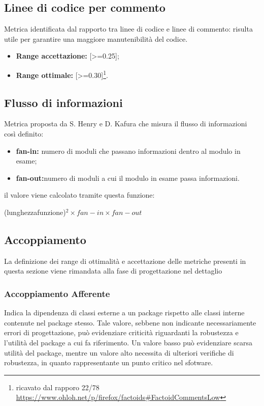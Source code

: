 \subsection{Linee di codice per commento}
Metrica identificata dal rapporto tra linee di codice e linee di commento: risulta utile per garantire una maggiore manutenibilità del codice.

\begin{itemize}
	\item \textbf{Range accettazione:} [>=0.25];
	\item \textbf{Range ottimale:} [>=0.30]\footnote{ricavato dal rapporo 22/78 \url{https://www.ohloh.net/p/firefox/factoids\#FactoidCommentsLow}}.
\end{itemize}  

\subsection{Flusso di informazioni}
Metrica proposta da S. Henry e D. Kafura che misura il flusso di informazioni così definito:

\begin{itemize}
	\item \textbf{fan-in:} numero di moduli che passano informazioni dentro al modulo in esame;
	\item \textbf{fan-out:}numero di moduli a cui il modulo in esame passa informazioni.
\end{itemize} 
il valore viene calcolato tramite questa funzione:
\begin{center}
(lunghezzafunzione)$^2\times fan-in\times fan-out$
\end{center}


\subsection{Accoppiamento}
La definizione dei range di ottimalità e accettazione delle metriche presenti in questa sezione viene rimandata alla fase di progettazione nel dettaglio 
\subsubsection{Accoppiamento Afferente}
Indica la dipendenza di classi esterne a un package rispetto alle classi interne contenute nel package stesso.
Tale valore, sebbene non indicante necessariamente errori di progettazione, può evidenziare criticità riguardanti la robustezza e l'utilità del package a
cui fa riferimento.
Un valore basso può evidenziare scarsa utilità del package, mentre un valore alto necessita di ulteriori verifiche di robustezza, in quanto rappresentante un punto critico nel sfotware.
